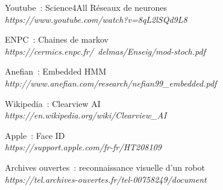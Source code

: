\documentclass[12pt,french]{article}
\theoremstyle{plain}
\theoremstyle{definition}
\begin{document}
\begin{thebibliography}
	\bibitem{}
	Youtube~: Science4All Réseaux de neurones 
	\\\textit{https://www.youtube.com/watch?v=8qL2lSQd9L8}
	
	\bibitem{}
	ENPC~: Chaines de markov
	\\\textit{https://cermics.enpc.fr/~delmas/Enseig/mod-stoch.pdf}
	
	\bibitem{}
	Anefian~: Embedded HMM
	\\\textit{http://www.anefian.com/research/nefian99_embedded.pdf}
	
	\bibitem{}
	Wikipedia~: Clearview AI
	\\\textit{https://en.wikipedia.org/wiki/Clearview_AI}
	
	\bibitem{}
	Apple~: Face ID
	\\\textit{https://support.apple.com/fr-fr/HT208109}
	
	\bibitem{}
	Archives ouvertes~: reconnaissance visuelle d'un robot
	\\\textit{https://tel.archives-ouvertes.fr/tel-00758249/document}
\end{thebibliography}		
\end{document}
